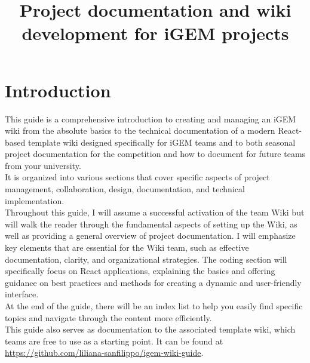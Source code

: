 \documentclass[a4paper, 11pt, twoside]{book}
\title{Project documentation and wiki development for iGEM projects}
\date{}
\author{}
\begin{document}
\pagecolor{pgcolor}
\frontmatter
\maketitle

\tableofcontents
\newpage


\pagecolor{pgcolor}

\renewcommand{\chapterdate}{30.06.2025}
\chapter{Introduction} \label{ch:introduction}
This guide is a comprehensive introduction to creating and managing an iGEM wiki from the absolute basics to the
technical documentation of a modern React-based template wiki designed specifically for iGEM teams and to both
seasonal project documentation for the competition and how to document for future teams from your university.  \\ \newline
It is organized into various sections that cover specific aspects of project management, collaboration, design, documentation, and technical implementation. \\ \newline
Throughout this guide, I will assume a successful activation of the team Wiki but will walk the reader through the fundamental aspects of setting up the Wiki, as well as providing a general overview of project documentation.
I will emphasize key elements that are essential for the Wiki team, such as effective documentation, clarity, and organizational strategies.
The coding section will specifically focus on React applications, explaining the basics and offering guidance on best practices and methods for creating a dynamic and user-friendly interface. \\ \newline
At the end of the guide, there will be an index list to help you easily find specific topics and navigate through the content more efficiently. \\ \newline
This guide also serves as documentation to the associated template wiki, which teams are free to use as a starting point.
It can be found at \url{https://github.com/liliana-sanfilippo/igem-wiki-guide}.
\end{document}
